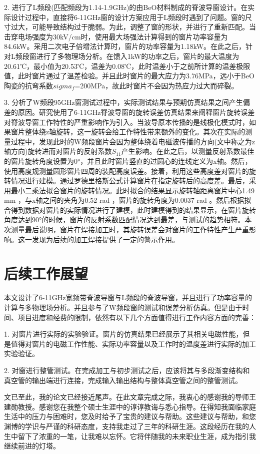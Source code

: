 \documentclass[master]{thesis-uestc}
\begin{document}
2. 进行了L频段(匹配频段为1.14-1.9GHz)的由BeO材料制成的脊波导窗设计。在实际设计过程中，直接将6-11GHz窗的设计方案应用于L频段时遇到了问题。窗的尺寸过大，可能导致结构过于脆弱。为此，调整了窗的形状，并进行了重新匹配。当击穿电场强度为30kV/cm时，使用最大场强法计算得到的窗片功率容量为84.6kW。采用二次电子倍增法计算时，窗片的功率容量为1.18kW。在此之后，针对L频段窗进行了多物理场分析。在馈入1kW的功率之后，窗片的最大温度为20.61℃，最小值为20.53℃，温差为0.08℃，此时温差小于之前所计算的温差极限值，此时窗片通过了温差检验。并且此时窗片的最大应力为3.76MPa，远小于BeO陶瓷的抗弯系数\(sigma_f\)=200MPa，故此时窗片不会因为热应力过大而碎裂。

3. 分析了W频段95GHz窗测试过程中，实际测试结果与预期仿真结果之间产生偏差的原因。研究使用了6-11GHz脊波导窗的旋转误差仿真结果来阐释窗片旋转误差对脊波导窗工作特性的严重影响作为引入。当波导原本传播的是线极化模式时，如果窗片整体绕z轴旋转，这一旋转会给工作特性带来额外的变化。其次在实际的测量过程中，发现此时的W频段窗片会因为整体绕着电磁波传播的方向(文中称之为z轴方向)旋转进而对窗片的反射系数\(S_{11}\)产生影响。在此之后，以测量反射系数最佳的窗片旋转角度设置为0°，并且此时窗片竖直的过圆心的连线定义为x轴。然后，使用高度规测量圆形窗片四周的装配高度误差。接着，利用这些高度差对窗片的旋转情况进行建模。通过罗德里格斯公式计算窗片在指定旋转后的高度差。最后，采用最小二乘法拟合窗片的旋转情况。此时拟合的结果显示旋转轴距离窗片中心1.49 mm ，与x轴之间的夹角为0.52 rad ，窗片的旋转角度为0.0037 rad 。然后根据拟合得到数据对窗片的实际情况进行了建模，此时建模得到的结果显示，在窗片旋转角度达到90°的时候，窗片的反射系数匹配情况达到最差，与测试的趋势相符。本次测量最后说明，窗片在焊接加工时，其旋转误差会对窗片的工作特性产生严重影响。这一发现为后续的加工焊接提供了一定的警示作用。

\section{后续工作展望}
本文设计了6-11GHz宽频带脊波导窗与L频段的脊波导窗，并且进行了功率容量的计算与多物理场分析。并且参与了W频段窗的测试和误差分析仿真。但是由于时间、项目进度和经费的限制，依然有以下几个方面值得进行工作内容方面的完善：

1. 对窗片进行实际的实验验证。窗片的仿真结果已经展示了其相关电磁性能，但是值得对窗片的电磁工作性能、实际功率容量以及工作时的温度差进行实际的加工实验验证。

2. 对窗进行整管测试。在完成加工与初步测试之后，应该将其与多段渐变结构和真空管的输出端进行连接，完成输入输出结构与整体真空管之间的整管测试。


\thesisacknowledgement
文已至此，我的论文已经接近尾声。在此文章完成之际，我衷心的感谢我的导师王建勋教授。感谢您在我整个硕士生涯中的谆谆教诲与悉心指导。在得知我面临家庭生活中的压力与困难时，您及时给予了宝贵的建议与帮助。这些建议与帮助，和您渊博的学识与严谨的科研态度，支持我走过了三年的科研生涯。这段经历在我的人生中留下了浓重的一笔，让我难以忘怀。它将伴随我的未来职业生涯，成为指引我继续前进的灯塔。
\end{document}
